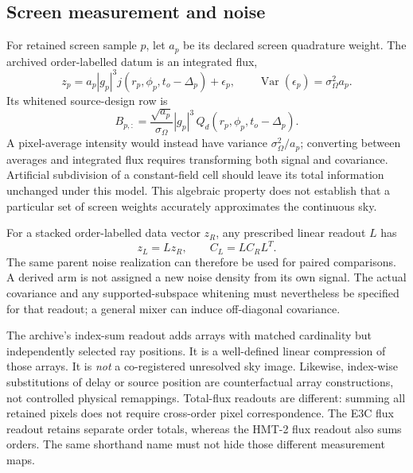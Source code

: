 \subsection{Screen measurement and noise}
For retained screen sample $p$, let $a_p$ be its declared screen quadrature weight. The archived order-labelled datum is an integrated flux,
\begin{equation}
z_p=a_p|g_p|^3 j(r_p,\phi_p,t_o-\Delta_p)+\epsilon_p,
\qquad \operatorname{Var}(\epsilon_p)=\sigma_\Omega^2 a_p.
\label{eq:fluxnoise}
\end{equation}
Its whitened source-design row is
\begin{equation}
B_{p,:}=\frac{\sqrt{a_p}}{\sigma_\Omega}|g_p|^3
\,Q_d(r_p,\phi_p,t_o-\Delta_p).
\label{eq:whitenedrow}
\end{equation}
A pixel-average intensity would instead have variance $\sigma_\Omega^2/a_p$; converting between averages and integrated flux requires transforming both signal and covariance. Artificial subdivision of a constant-field cell should leave its total information unchanged under this model. This algebraic property does not establish that a particular set of screen weights accurately approximates the continuous sky.

For a stacked order-labelled data vector $z_R$, any prescribed linear readout $L$ has
\begin{equation}
z_L=Lz_R,\qquad C_L=LC_RL^T.
\label{eq:readout}
\end{equation}
The same parent noise realization can therefore be used for paired comparisons. A derived arm is not assigned a new noise density from its own signal. The actual covariance and any supported-subspace whitening must nevertheless be specified for that readout; a general mixer can induce off-diagonal covariance.

The archive's index-sum readout adds arrays with matched cardinality but independently selected ray positions. It is a well-defined linear compression of those arrays. It is \emph{not} a co-registered unresolved sky image. Likewise, index-wise substitutions of delay or source position are counterfactual array constructions, not controlled physical remappings. Total-flux readouts are different: summing all retained pixels does not require cross-order pixel correspondence. The E3C flux readout retains separate order totals, whereas the HMT-2 flux readout also sums orders. The same shorthand name must not hide those different measurement maps.

